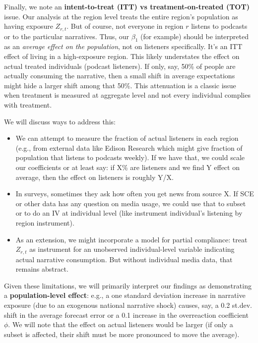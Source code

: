 \documentclass[12pt]{article}
\begin{document}
Finally, we note an \textbf{intent-to-treat (ITT) vs treatment-on-treated (TOT)} issue. Our analysis at the region level treats the entire region's population as having exposure $Z_{r,t}$. But of course, not everyone in region $r$ listens to podcasts or to the particular narratives. Thus, our $\beta_1$ (for example) should be interpreted as an \emph{average effect on the population}, not on listeners specifically. It's an ITT effect of living in a high-exposure region. This likely understates the effect on actual treated individuals (podcast listeners). If only, say, 50\% of people are actually consuming the narrative, then a small shift in average expectations might hide a larger shift among that 50\%. This attenuation is a classic issue when treatment is measured at aggregate level and not every individual complies with treatment.

We will discuss ways to address this:
\begin{itemize}
    \item We can attempt to measure the fraction of actual listeners in each region (e.g., from external data like Edison Research which might give fraction of population that listens to podcasts weekly). If we have that, we could scale our coefficients or at least say: if X\% are listeners and we find Y effect on average, then the effect on listeners is roughly Y/X.
    \item In surveys, sometimes they ask how often you get news from source X. If SCE or other data has any question on media usage, we could use that to subset or to do an IV at individual level (like instrument individual's listening by region instrument).
    \item As an extension, we might incorporate a model for partial compliance: treat $Z_{r,t}$ as instrument for an unobserved individual-level variable indicating actual narrative consumption. But without individual media data, that remains abstract.
\end{itemize}

Given these limitations, we will primarily interpret our findings as demonstrating a \textbf{population-level effect}: e.g., a one standard deviation increase in narrative exposure (due to an exogenous national narrative shock) causes, say, a 0.2 st.dev. shift in the average forecast error or a 0.1 increase in the overreaction coefficient $\phi$. We will note that the effect on actual listeners would be larger (if only a subset is affected, their shift must be more pronounced to move the average).
\end{document}

